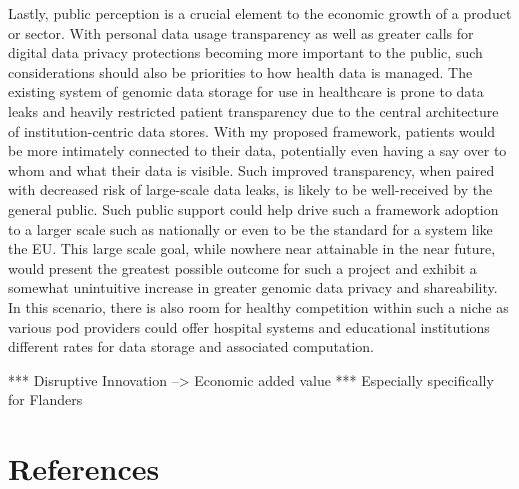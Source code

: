 \documentclass[a4paper,11pt]{article}
\begin{document}
\begin{refsection}
Lastly, public perception is a crucial element to the economic growth of a product or sector. With personal data usage transparency as well as greater calls for digital data privacy protections becoming more important to the public, such considerations should also be priorities to how health data is managed. 
The existing system of genomic data storage for use in healthcare is prone to data leaks and heavily restricted patient transparency due to the central architecture of institution-centric data stores. 
With my proposed framework, patients would be more intimately connected to their data, potentially even having a say over to whom and what their data is visible. 
Such improved transparency, when paired with decreased risk of large-scale data leaks, is likely to be well-received by the general public. 
Such public support could help drive such a framework adoption to a larger scale such as nationally or even to be the standard for a system like the EU. 
This large scale goal, while nowhere near attainable in the near future, would present the greatest possible outcome for such a project and exhibit a somewhat unintuitive increase in greater genomic data privacy and shareability. 
In this scenario, there is also room for healthy competition within such a niche as various pod providers could offer hospital systems and educational institutions different rates for data storage and associated computation.

*** Disruptive Innovation --> Economic added value ***
Especially specifically for Flanders


\section{References}
\smallskip
\printbibliography[heading=none]


\end{refsection}
\end{document}
